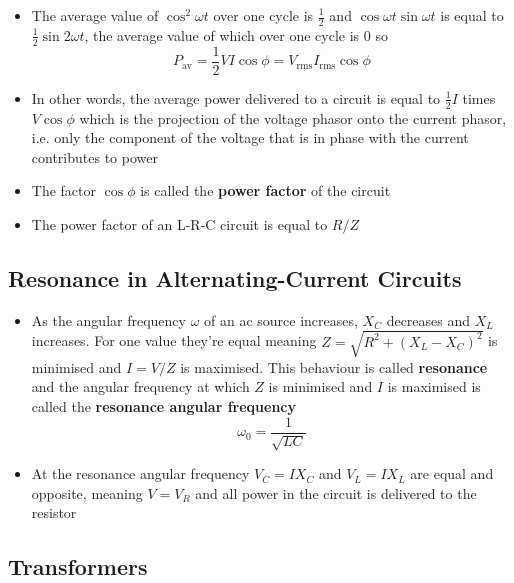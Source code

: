 \documentclass{article}
\begin{document}
\begin{itemize}
  \item The average value of $\cos^2 \omega t$ over one cycle is $\frac{1}{2}$ and $\cos \omega t \sin \omega t$ is equal to $\frac{1}{2} \sin 2 \omega t$, the average value of which over one cycle is $0$ so \[P_\text{av} = \frac{1}{2} V I \cos \phi = V_\text{rms} I_\text{rms} \cos \phi\]

  \item In other words, the average power delivered to a circuit is equal to $\frac{1}{2} I$ times $V \cos \phi$ which is the projection of the voltage phasor onto the current phasor, i.e. only the component of the voltage that is in phase with the current contributes to power

  \item The factor $\cos \phi$ is called the \textbf{power factor} of the circuit

  \item The power factor of an L-R-C circuit is equal to $R / Z$
\end{itemize}

\subsection{Resonance in Alternating-Current Circuits}

\begin{itemize}
  \item As the angular frequency $\omega$ of an ac source increases, $X_C$ decreases and $X_L$ increases. For one value they're equal meaning $Z = \sqrt{R^2 + (X_L - X_C)^2}$ is minimised and $I = V / Z$ is maximised. This behaviour is called \textbf{resonance} and the angular frequency at which $Z$ is minimised and $I$ is maximised is called the \textbf{resonance angular frequency} \[\omega_0 = \frac{1}{\sqrt{L C}}\]

  \item At the resonance angular frequency $V_C = I X_C$ and $V_L = I X_L$ are equal and opposite, meaning $V = V_R$ and all power in the circuit is delivered to the resistor
\end{itemize}

\subsection{Transformers}
\end{document}
